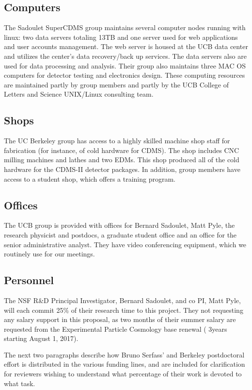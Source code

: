 \subsection{Computers}
The Sadoulet SuperCDMS group maintains several computer nodes running with linux: two data servers totaling 13TB and one server used for web applications and user accounts management. The web server is housed at the UCB data center and utilizes the center's data recovery/back up services. The data servers also are used for data processing and analysis. Their group also maintains three MAC OS computers for detector testing and electronics design. These computing resources are maintained partly by group members and partly by the UCB College of Letters and Science UNIX/Linux consulting team. 

\subsection{Shops}
The UC Berkeley group has access to a highly skilled machine shop staff for fabrication (for instance, of cold hardware for CDMS). The shop includes CNC milling machines and lathes and two EDMs. This shop produced all of the cold hardware for the CDMS-II detector packages. In addition, group members have access to a student shop, which offers a training program.

\subsection{Offices}
The UCB group is provided with offices for Bernard Sadoulet, Matt Pyle, the research physicist and postdocs, a graduate student office and an office for the senior administrative analyst. They have video conferencing equipment, which we routinely use for our meetings. 

\subsection{Personnel}
The NSF R\&D Principal Investigator, Bernard Sadoulet,  and co PI, Matt Pyle, will each commit 25\% of their research time to this project. They not requesting any salary support in this proposal, as two months of their  summer salary are requested from the Experimental Particle Cosmology base renewal ( 3years starting August 1, 2017).

The next two paragraphs describe how Bruno Serfass' and Berkeley postdoctoral effort is distributed in the various \SuperCDMS funding lines, and are included for clarification for reviewers wishing to understand what percentage of their work is devoted to what task.

